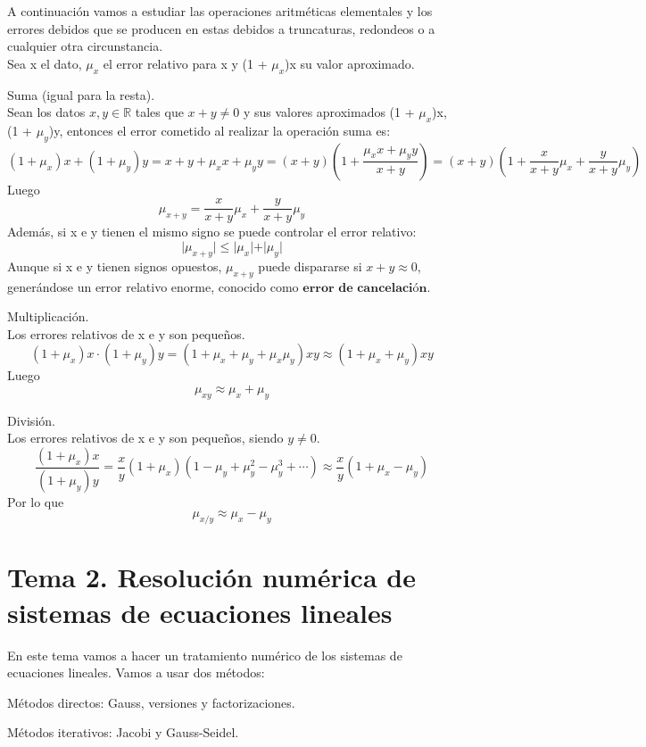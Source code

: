 A continuación vamos a estudiar las operaciones aritméticas elementales y los errores debidos que se producen en estas debidos a truncaturas, redondeos o a cualquier otra circunstancia.\\
Sea x el dato, $\mu _x$ el error relativo para x y (1 + $\mu _x$)x su valor aproximado.
	\begin{nlist}
	\item Suma (igual para la resta).\\
	Sean los datos $x, y \in \mathbb{R}$ tales que $x + y \neq 0$ y sus valores aproximados (1 + $\mu _x$)x, (1 + $\mu _y$)y, entonces el error cometido al realizar la operación suma es:
	\[ (1 + \mu _x)x + (1 + \mu _y)y = x + y + \mu _xx + \mu _yy = (x+y) \left( 1 + \frac{\mu _xx + \mu _yy}{x+y} \right) = (x+y) \left( 1 + \frac{x}{x+y} \mu _x + \frac{y}{x+y} \mu _y \right)  \]
	Luego
	\[ \mu _{x+y} = \frac{x}{x+y} \mu _x + \frac{y}{x+y} \mu _y \]
	Además, si x e y tienen el mismo signo se puede controlar el error relativo:
	\[ \vert \mu _{x+y} \vert \leq \vert \mu _x \vert + \vert \mu _y \vert \]
	Aunque si x e y tienen signos opuestos, $\mu _{x+y}$ puede dispararse si $x + y \approx 0$, generándose un error relativo enorme, conocido como $\textbf{error de cancelación}$. 
	\item Multiplicación.\\
	Los errores relativos de x e y son pequeños.
	\[ (1 + \mu _x)x \cdot (1 + \mu _y)y = (1 + \mu _x + \mu _y + \mu _x \mu _y)xy \approx (1 + \mu _x + \mu _y)xy \]
	Luego
	\[ \mu _{xy} \approx \mu _x + \mu _y \]
	\item División.\\
	Los errores relativos de x e y son pequeños, siendo $y \neq 0$.
	\[ \frac{(1 + \mu _x)x}{(1 + \mu _y)y} = \frac{x}{y}(1 + \mu _x)(1 - \mu _y + \mu _y^2 - \mu _y^3 + \cdots) \approx \frac{x}{y}(1 + \mu _x - \mu _y) \]
	Por lo que
	\[ \mu _{x/y} \approx \mu _x - \mu _y \]
	\end{nlist}	
	
	
\part{Tema 2. Resolución numérica de sistemas de ecuaciones lineales}
En este tema vamos a hacer un tratamiento numérico de los sistemas de ecuaciones lineales. Vamos a usar dos métodos:
	\begin{nlist}
	\item Métodos directos: Gauss, versiones y factorizaciones.
	\item Métodos iterativos: Jacobi y Gauss-Seidel.
	\end{nlist}

